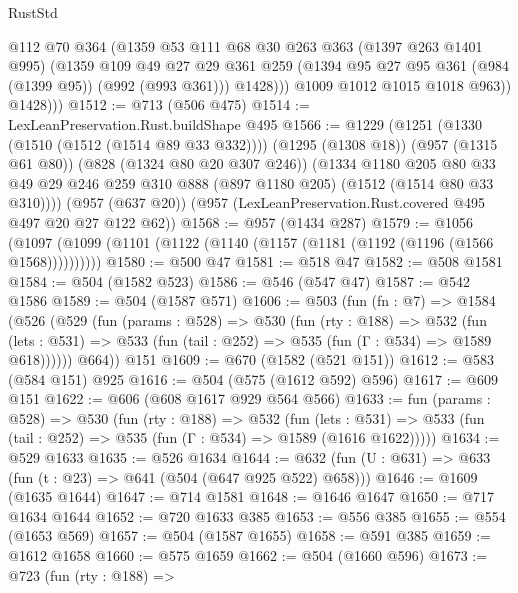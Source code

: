 \begin{lexlean}{RustStd}
\begin{coremodule}
                @112
                @70
                @364
                (@1359
                  @53
                  @111
                  @68
                  @30
                  @263
                  @363
                  (@1397 @263 @1401 @995)
                  (@1359
                    @109
                    @49
                    @27
                    @29
                    @361
                    @259
                    (@1394 @95 @27 @95 @361 (@984 (@1399 @95)) (@992 (@993 @361)))
                    @1428)))
              @1009
              @1012
              @1015
              @1018
              @963))
          @1428)))
@1512 := @713 (@506 @475)
@1514 := LexLeanPreservation.Rust.buildShape @495
@1566 := @1229
    (@1251
      (@1330 (@1510 (@1512 (@1514 @89 @33 @332))))
      (@1295 (@1308 @18))
      (@957 (@1315 @61 @80))
      (@828 (@1324 @80 @20 @307 @246))
      (@1334
        @1180
        @205
        @80
        @33
        @49
        @29
        @246
        @259
        @310
        @888
        (@897 @1180 @205)
        (@1512 (@1514 @80 @33 @310))))
    (@957 (@637 @20))
    (@957 (LexLeanPreservation.Rust.covered @495 @497 @20 @27 @122 @62))
@1568 := @957 (@1434 @287)
@1579 := @1056 (@1097 (@1099 (@1101 (@1122 (@1140 (@1157 (@1181 (@1192 (@1196 (@1566 @1568))))))))))
@1580 := @500 @47
@1581 := @518 @47
@1582 := @508 @1581
@1584 := @504 (@1582 @523)
@1586 := @546 (@547 @47)
@1587 := @542 @1586
@1589 := @504 (@1587 @571)
@1606 := @503
    (fun (fn : @7) =>
    @1584
      (@526
        (@529
          (fun (params : @528) =>
          @530
            (fun (rty : @188) =>
            @532
              (fun (lets : @531) =>
              @533 (fun (tail : @252) => @535 (fun (Γ : @534) => @1589 @618))))))
        @664))
    @151
@1609 := @670 (@1582 (@521 @151))
@1612 := @583 (@584 @151) @925
@1616 := @504 (@575 (@1612 @592) @596)
@1617 := @609 @151
@1622 := @606 (@608 @1617 @929 @564 @566)
@1633 := fun (params : @528) =>
  @530
    (fun (rty : @188) =>
    @532
      (fun (lets : @531) =>
      @533 (fun (tail : @252) => @535 (fun (Γ : @534) => @1589 (@1616 @1622)))))
@1634 := @529 @1633
@1635 := @526 @1634
@1644 := @632 (fun (U : @631) => @633 (fun (t : @23) => @641 (@504 (@647 @925 @522) @658)))
@1646 := @1609 (@1635 @1644)
@1647 := @714 @1581
@1648 := @1646 @1647
@1650 := @717 @1634 @1644
@1652 := @720 @1633 @385
@1653 := @556 @385
@1655 := @554 (@1653 @569)
@1657 := @504 (@1587 @1655)
@1658 := @591 @385
@1659 := @1612 @1658
@1660 := @575 @1659
@1662 := @504 (@1660 @596)
@1673 := @723
    (fun (rty : @188) =>

\end{coremodule}
\end{lexlean}
